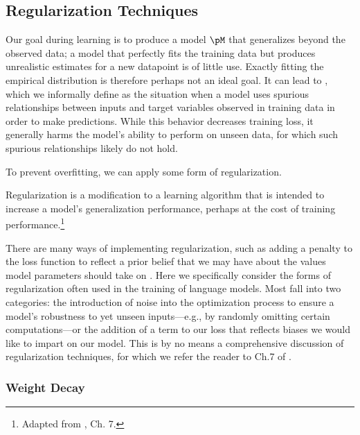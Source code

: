 \subsection{Regularization Techniques}
Our goal during learning is to produce a model $\pM$ that generalizes beyond the observed data; a model that perfectly fits the training data but produces unrealistic estimates for a new datapoint is of little use.   
Exactly fitting the empirical distribution is therefore perhaps not an ideal goal. It can lead to , which we informally define as the situation when a model uses spurious relationships between inputs and target variables observed in training data in order to make predictions. While this behavior decreases training loss, it generally harms the model's ability to perform on unseen data, for which such spurious relationships likely do not hold.


To prevent overfitting, we can apply some form of regularization. 
\begin{principle}[Regularization]
    Regularization is a modification to a learning algorithm that is intended to increase a model's generalization performance, perhaps at the cost of training performance.\footnote{Adapted from \citet{Goodfellow-et-al-2016}, Ch. 7.}
\end{principle}
 There are many ways of implementing regularization, such as adding a penalty to the  loss function to reflect a prior belief that we may have about the values model parameters should take on \cite{hastie01statisticallearning,bishop}.
Here we specifically consider the forms of regularization often used in the training of language models. 
Most fall into two categories: the introduction of  noise into the optimization process to ensure a model's robustness to yet unseen inputs---e.g., by randomly omitting certain computations---or the addition of a term to our loss that reflects biases we would like to impart on our model. This is by no means a comprehensive discussion of regularization techniques, for which we refer the reader to Ch.7 of \citet{Goodfellow-et-al-2016}.


\subsubsection{Weight Decay}

